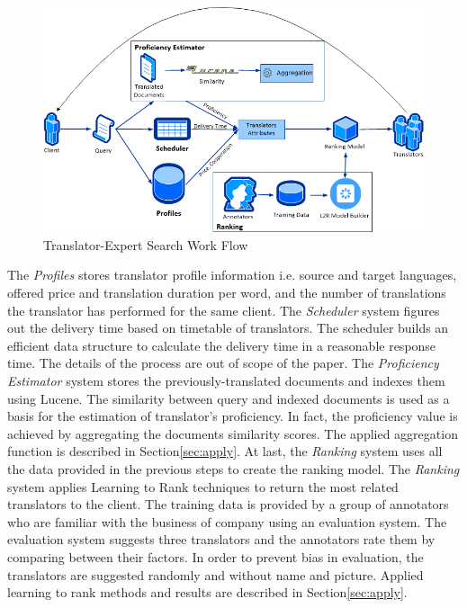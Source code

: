 \begin{figure}
\begin{center}
\includegraphics[width=12cm]{figures/dataflow.png}
\caption{Translator-Expert Search Work Flow
\label{fig:architecture}}
\end{center}
\end{figure}

The \textit{Profiles} stores translator profile information i.e. source and target languages, offered price and translation duration per word, and the number of translations the translator has performed for the same client. The \textit{Scheduler} system figures out the delivery time based on timetable of translators. The scheduler builds an efficient data structure to calculate the delivery time in a reasonable response time. The details of the process are out of scope of the paper. The \textit{Proficiency Estimator} system stores the previously-translated documents and indexes them using Lucene. The similarity between query and indexed documents is used as a basis for the estimation of translator's proficiency. In fact, the proficiency value is achieved by aggregating the documents similarity scores. The applied aggregation function is described in Section\ref{sec:apply}. At last, the \textit{Ranking} system uses all the data provided in the previous steps to create the ranking model. The \textit{Ranking} system applies Learning to Rank techniques to return the most related translators to the client. The training data is provided by a group of annotators who are familiar with the business of company using an evaluation system. The evaluation system suggests three translators and the annotators rate them by comparing between their factors. In order to prevent bias in evaluation, the translators are suggested randomly and without name and picture. Applied learning to rank methods and results are described in Section\ref{sec:apply}. 

